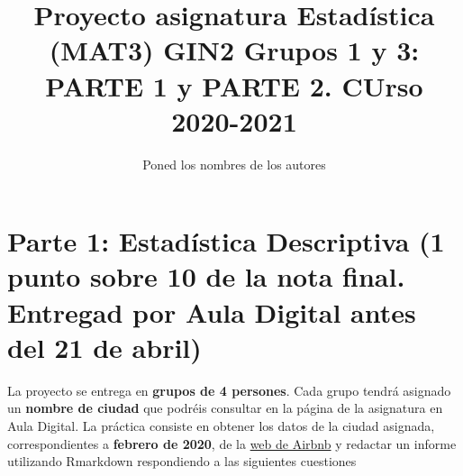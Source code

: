 \documentclass[
]{article}
\title{Proyecto asignatura Estadística (MAT3) GIN2 Grupos 1 y 3: PARTE 1
y PARTE 2. CUrso 2020-2021}
\author{Poned los nombres de los autores}
\date{}
\begin{document}
\maketitle

{
\hypersetup{linkcolor=blue}
\setcounter{tocdepth}{2}
\tableofcontents
}
\hypertarget{parte-1-estaduxedstica-descriptiva-1-punto-sobre-10-de-la-nota-final.-entregad-por-aula-digital-antes-del-21-de-abril}{%
\section{Parte 1: Estadística Descriptiva (1 punto sobre 10 de la nota
final. Entregad por Aula Digital antes del 21 de
abril)}\label{parte-1-estaduxedstica-descriptiva-1-punto-sobre-10-de-la-nota-final.-entregad-por-aula-digital-antes-del-21-de-abril}}

La proyecto se entrega en \textbf{grupos de 4 persones}. Cada grupo
tendrá asignado un \textbf{nombre de ciudad} que podréis consultar en la
página de la asignatura en Aula Digital. La práctica consiste en obtener
los datos de la ciudad asignada, correspondientes a \textbf{febrero de
2020}, de la \href{http://insideairbnb.com/get-the-data.html}{web de
Airbnb} y redactar un informe utilizando Rmarkdown respondiendo a las
siguientes cuestiones
\end{document}
